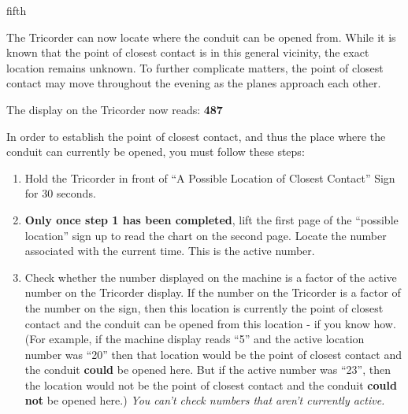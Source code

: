 \documentclass[notebook]{elementals}
\begin{document}
\begin{page}{fifth}

The Tricorder can now locate where the conduit can be opened from. While it is known that the point of closest contact is in this general vicinity, the exact location remains unknown. To further complicate matters, the point of closest contact may move throughout the evening as the planes approach each other.

The display on the Tricorder now reads: {\bf {\large 487}}

In order to establish the point of closest contact, and thus the place where the conduit can currently be opened, you must follow these steps:
\begin{enumerate}
  \item Hold the Tricorder in front of ``A Possible Location of Closest Contact'' Sign for 30 seconds.
  \item {\bf Only once step 1 has been completed}, lift the first page of the ``possible location'' sign up to read the chart on the second page. Locate the number associated with the current time. This is the active number.
  \item Check whether the number displayed on the machine is a factor of the active number on the Tricorder display. If the number on the Tricorder is a factor of the number on the sign, then this location is currently the point of closest contact and the conduit can be opened from this location - if you know how. (For example, if the machine display reads ``5'' and the active location number was ``20'' then that location would be the point of closest contact and the conduit {\bf could} be opened here. But if the active number was ``23'', then the location would not be the point of closest contact and the conduit {\bf could not} be opened here.) \emph{You can't check numbers that aren't currently active.} 
\end{enumerate}
\end{page}

\endnotebook
\end{document}
